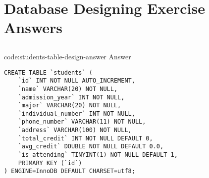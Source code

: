 \section{Database Designing Exercise Answers}\label{sect:db-designing-answers}

\subsection*{}

\begin{code}{code:students-table-design-answer}{ Answer}
\begin{verbatim}
CREATE TABLE `students` (
    `id` INT NOT NULL AUTO_INCREMENT,
    `name` VARCHAR(20) NOT NULL,
    `admission_year` INT NOT NULL,
    `major` VARCHAR(20) NOT NULL,
    `individual_number` INT NOT NULL,
    `phone_number` VARCHAR(11) NOT NULL,
    `address` VARCHAR(100) NOT NULL,
    `total_credit` INT NOT NULL DEFAULT 0,
    `avg_credit` DOUBLE NOT NULL DEFAULT 0.0,
    `is_attending` TINYINT(1) NOT NULL DEFAULT 1,
    PRIMARY KEY (`id`)
) ENGINE=InnoDB DEFAULT CHARSET=utf8;
\end{verbatim}
\end{code}

\subsection*{}

